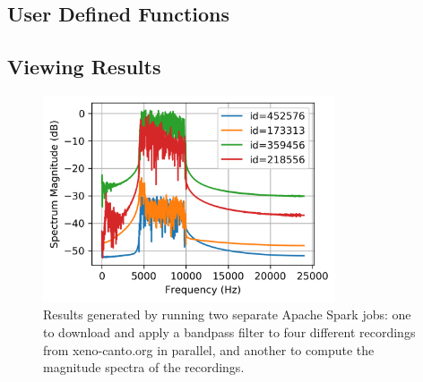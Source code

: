\documentclass[conference,twoside]{IEEEtran}
\begin{document}
\subsection{User Defined Functions}


\subsection{Viewing Results}
\begin{figure}[!htb]
  \centering
  \includegraphics[width=3.4in]{output_spectrum}
  \caption{Results generated by running two separate Apache Spark jobs: one to download and apply a bandpass filter to four different recordings from xeno-canto.org in parallel, and another to compute the magnitude spectra of the recordings.}
  \label{fig:spectra}
\end{figure}
\end{document}
